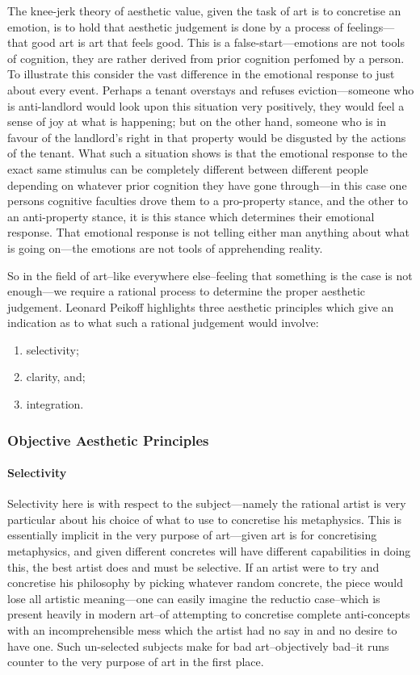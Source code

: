 \documentclass[11pt]{article}
\begin{document}
The knee-jerk theory of aesthetic value, given the task of art is to concretise an emotion, is to hold that aesthetic judgement is done by a process of feelings---that good art is art that feels good. This is a false-start---emotions are not tools of cognition, they are rather derived from prior cognition perfomed by a person. To illustrate this consider the vast difference in the emotional response to just about every event. Perhaps a tenant overstays and refuses eviction---someone who is anti-landlord would look upon this situation very positively, they would feel a sense of joy at what is happening; but on the other hand, someone who is in favour of the landlord's right in that property would be disgusted by the actions of the tenant. What such a situation shows is that the emotional response to the exact same stimulus can be completely different between different people depending on whatever prior cognition they have gone through---in this case one persons cognitive faculties drove them to a pro-property stance, and the other to an anti-property stance, it is this stance which determines their emotional response. That emotional response is not telling either man anything about what is going on---the emotions are not tools of apprehending reality.

So in the field of art--like everywhere else--feeling that something is the case is not enough---we require a rational process to determine the proper aesthetic judgement. Leonard Peikoff highlights three aesthetic principles which give an indication as to what such a rational judgement would involve:
\begin{enumerate}
\item selectivity;
\item clarity, and;
\item integration.
\end{enumerate}

\subsubsection*{Objective Aesthetic Principles}
\label{sec:org6df6041}
\paragraph*{Selectivity}
\label{sec:org951d93a}
Selectivity here is with respect to the subject---namely the rational artist is very particular about his choice of what to use to concretise his metaphysics. This is essentially implicit in the very purpose of art---given art is for concretising metaphysics, and given different concretes will have different capabilities in doing this, the best artist does and must be selective. If an artist were to try and concretise his philosophy by picking whatever random concrete, the piece would lose all artistic meaning---one can easily imagine the reductio case--which is present heavily in modern art--of attempting to concretise complete anti-concepts with an incomprehensible mess which the artist had no say in and no desire to have one. Such un-selected subjects make for bad art--objectively bad--it runs counter to the very purpose of art in the first place.
\end{document}
